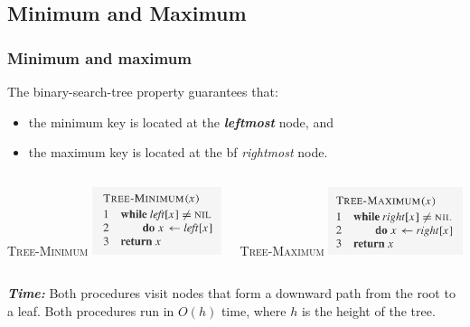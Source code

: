 \documentclass[notes,serif]{beamer}
\begin{document}
\subsection{Minimum and Maximum}
\begin{frame}
\frametitle{Minimum and maximum}
  The binary-search-tree property guarantees that:
  \begin{itemize}
    \item the minimum key is located at the {\bf \em leftmost} node, and
    \item the maximum key is located at the {bf \em rightmost} node.
  \end{itemize}
  \begin{columns}
  \begin{block}{\scriptsize \textsc{Tree-Minimum}}
    \includegraphics[height=2cm]{12-tree_minimum}
  \end{block}

  \begin{block}{\scriptsize \textsc{Tree-Maximum}}
    \includegraphics[height=2cm]{12-tree_maximum}
  \end{block}

  \end{columns}
  \begin{block}{}
  {\bf\em Time:} Both procedures visit nodes that form a downward path from the root to a
leaf. Both procedures run in $O(h)$ time, where $h$ is the height of the tree.
  \end{block}
\end{frame}
\end{document}
